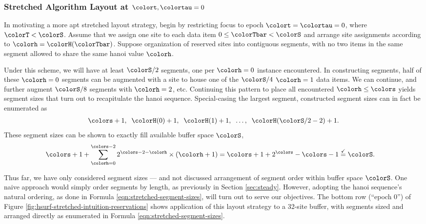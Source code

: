 \subsubsection{Stretched Algorithm Layout at $\colort,\colortau=0$}

In motivating a more apt stretched layout strategy, begin by restricting focus to epoch $\colort=\colortau=0$, where $\colorT < \colorS$.
Assume that we assign one site to each data item $0\leq \colorTbar < \colorS$ and arrange site assignments according to \hv{} $\colorh = \colorH(\colorTbar)$.
Suppose organization of reserved sites into contiguous segments, with no two items in the same segment allowed to share the same hanoi value $\colorh$.

Under this scheme, we will have at least $\colorS/2$ segments, one per \hv{} $\colorh=0$ instance encountered.
In constructing segments, half of these $\colorh=0$ segments can be augmented with a site to house one of the $\colorS/4$ \hv{} $\colorh=1$ data items.
We can continue, and further augment $\colorS/8$ segments with \hv{} $\colorh=2$, etc.
Continuing this pattern to place all encountered \hv{} $\colorh\leq\colors$ yields segment sizes that turn out to recapitulate the hanoi sequence.
Special-casing the largest segment, constructed segment sizes can in fact be enumerated as
\begin{align}
\colors + 1,\;\; \colorH(0) + 1,\;\; \colorH(1) + 1,\;\; \ldots,\;\; \colorH(\colorS/2 - 2) + 1.
\label{eqn:stretched-segment-sizes}
\end{align}
These segment sizes can be shown to exactly fill available buffer space $\colorS$,
\begin{align*}
\colors + 1
+  \sum_{\colorh = 0}^{\colors - 2}
2^{\colors - 2 - \colorh} \times (\colorh + 1)
&=
\colors + 1 +
2^{\colors} - \colors - 1
\stackrel{\checkmark}{=}
\colorS.
\end{align*}

Thus far, we have only considered segment sizes --- and not discussed arrangement of segment order within buffer space $\colorS$.
One naive approach would simply order segments by length, as previously in Section \ref{sec:steady}.
However, adopting the hanoi sequence's natural ordering, as done in Formula \ref{eqn:stretched-segment-sizes}, will turn out to serve our objectives.
The bottom row (``epoch 0'') of Figure \ref{fig:hsurf-stretched-intuition-reservations} shows application of this layout strategy to a 32-site buffer, with segments sized and arranged directly as enumerated in Formula \ref{eqn:stretched-segment-sizes}.

